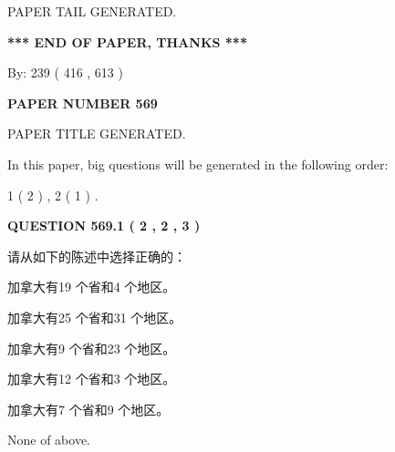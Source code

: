 \documentclass{ctexart}
\begin{document}
\vspace{2.0in} PAPER TAIL GENERATED.
   
   
   
   
\vspace{1.0in} 
{\textbf{\large{ *** END OF PAPER, THANKS *** }}} 
   
   
\hspace{1.0in} By: 
 239 ( 416 ,  613 )
   
   
   
   
\newpage 
\setcounter{page}{ 
   569001 } 
   
   
   
   
 {\textbf{ \Large{ PAPER NUMBER  569  }}}
   
   
\vspace{0.2in}
   
   
   
   
   
   
   
   
 \vspace{0.2in}
 
 
 
 
   
   
 PAPER TITLE GENERATED.
   
   
   
\vspace{0.2in}
   
In this paper, big questions will be generated in the following order: 
   
   
   1 ( 2 )
 ,
   2 ( 1 )
 .
  
\vspace{0.2in}
  
{\textbf{\Large{QUESTION
569.1 
 ( 2 , 2 , 3 )
}}}
  
  
请从如下的陈述中选择正确的：
 
 
加拿大有19 个省和4 个地区。
 
 
加拿大有25 个省和31 个地区。
 
 
加拿大有9 个省和23 个地区。
 
 
加拿大有12 个省和3 个地区。
 
 
加拿大有7 个省和9 个地区。
 
 
 None of above.
 
 
\noindent{}
 
\end{document}
